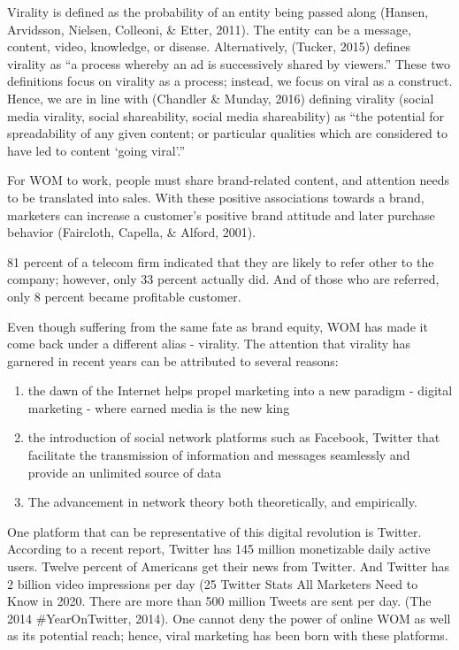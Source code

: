 \documentclass[
]{book}
\providecommand{\tightlist}{%
  \setlength{\itemsep}{0pt}\setlength{\parskip}{0pt}}
\begin{document}
Virality is defined as the probability of an entity being passed along (Hansen, Arvidsson, Nielsen, Colleoni, \& Etter, 2011). The entity can be a message, content, video, knowledge, or disease. Alternatively, (Tucker, 2015) defines virality as ``a process whereby an ad is successively shared by viewers.'' These two definitions focus on virality as a process; instead, we focus on viral as a construct. Hence, we are in line with (Chandler \& Munday, 2016) defining virality (social media virality, social shareability, social media shareability) as ``the potential for spreadability of any given content; or particular qualities which are considered to have led to content `going viral'.''

For WOM to work, people must share brand-related content, and attention needs to be translated into sales. With these positive associations towards a brand, marketers can increase a customer's positive brand attitude and later purchase behavior (Faircloth, Capella, \& Alford, 2001).

81 percent of a telecom firm indicated that they are likely to refer other to the company; however, only 33 percent actually did. And of those who are referred, only 8 percent became profitable customer. \citep{kumar_2007}

Even though suffering from the same fate as brand equity, WOM has made it come back under a different alias - virality. The attention that virality has garnered in recent years can be attributed to several reasons:

\begin{enumerate}
\def\labelenumi{(\arabic{enumi})}
\tightlist
\item
  the dawn of the Internet helps propel marketing into a new paradigm - digital marketing - where earned media is the new king
\item
  the introduction of social network platforms such as Facebook, Twitter that facilitate the transmission of information and messages seamlessly and provide an unlimited source of data
\item
  The advancement in network theory both theoretically, and empirically.
\end{enumerate}

One platform that can be representative of this digital revolution is Twitter. According to a recent report, Twitter has 145 million monetizable daily active users. Twelve percent of Americans get their news from Twitter. And Twitter has 2 billion video impressions per day (25 Twitter Stats All Marketers Need to Know in 2020. There are more than 500 million Tweets are sent per day. (The 2014 \#YearOnTwitter, 2014). One cannot deny the power of online WOM as well as its potential reach; hence, viral marketing has been born with these platforms.
\end{document}
